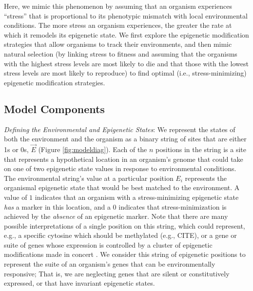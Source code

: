 \documentclass{article}
\begin{document}
Here, we mimic this phenomenon by assuming that an organism experiences ``stress'' that is proportional to its phenotypic mismatch with local environmental conditions. The more stress an organism experiences, the greater the rate at which it remodels its epigenetic state. We first explore the epigenetic modification strategies that allow organisms to track their environments, and then mimic natural selection (by linking stress to fitness and assuming that the organisms with the highest stress levels are most likely to die and that those with the lowest stress levels are most likely to reproduce) to find optimal (i.e., stress-minimizing) epigenetic modification strategies.

\subsection{Model Components}


\noindent \textit{Defining the Environmental and  Epigenetic States}: We represent the states of both the environment and the organism as a binary string of sites that are either 1s or 0s, $\vec{E}$ (Figure \ref{fig:modeldiag}). Each of the $n$ positions in the string is a site that represents a hypothetical location in an organism's genome that could take on one of two epigenetic state values in response to environmental conditions. The environmental string's value at a particular position $E_i$ represents the organismal epigenetic state that would be best matched to the environment. %
A value of $1$ indicates that an organism with a stress-minimizing epigenetic state \textit{has} a marker in this location, and a $0$ indicates that stress-minimization is achieved by the \textit{absence} of an epigenetic marker. Note that there are many possible interpretations of a single position on this string, which could represent, e.g., a specific cytosine which should be methylated (e.g., CITE), or a gene or suite of genes whose expression is controlled by a cluster of epigenetic modifications made in concert \cite{adrian2020understanding}. We consider this string of epigenetic positions to represent the suite of an organism's genes that can be environmentally responsive; That is, we are neglecting genes that are silent or constitutively expressed, or that have invariant epigenetic states.
\end{document}
